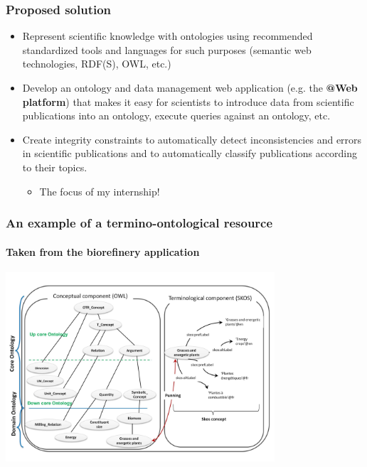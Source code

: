 \documentclass{beamer}
\begin{document}
\begin{frame}
  \frametitle{Proposed solution}

  \begin{itemize}
    \item Represent scientific knowledge with ontologies using recommended standardized tools and languages for such purposes (semantic web technologies, RDF(S), OWL, etc.)

    \pause

    \item Develop an ontology and data management web application (e.g. the \textbf{@Web platform}) that makes it easy for scientists to introduce data from scientific publications into an ontology, execute queries against an ontology, etc.

    \pause

    \item Create integrity constraints to automatically detect inconsistencies and errors in scientific publications and to automatically classify publications according to their topics.

    \pause

    \begin{itemize}
      \item The focus of my internship!
    \end{itemize}

  \end{itemize}
\end{frame}

\begin{frame}
  \frametitle{An example of a termino-ontological resource}
  \framesubtitle{Taken from the biorefinery application}

  \begin{center}
    \includegraphics[width=10cm]{termino-ontological-resource.jpg}
  \end{center}
\end{frame}
\end{document}
